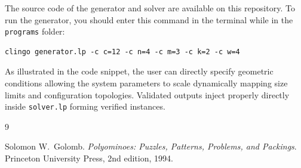 \documentclass[a4paper,UKenglish,cleveref, autoref, thm-restate]{lipics-v2021}
\begin{document}
The source code of the generator and solver are available on this repository. To run the generator, you should enter this command in the terminal while in the \texttt{programs} folder:

\begin{verbatim}
clingo generator.lp -c c=12 -c n=4 -c m=3 -c k=2 -c w=4
\end{verbatim}

As illustrated in the code snippet, the user can directly specify geometric conditions allowing the system parameters to scale dynamically mapping size limits and configuration topologies. Validated outputs inject properly directly inside \texttt{solver.lp} forming verified instances.

\begin{thebibliography}{9}

Solomon W.\ Golomb.
\newblock \emph{Polyominoes: Puzzles, Patterns, Problems, and Packings}.
\newblock Princeton University Press, 2nd edition, 1994.

\end{thebibliography}
\end{document}

